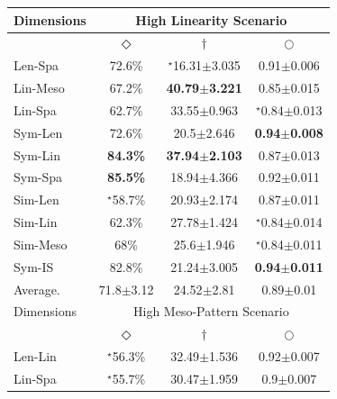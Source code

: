 \begin{table}[t!]
{\begin{tabular}{|l|ccc|}
Dimensions & \multicolumn{3}{c|}{High Linearity Scenario}                                                  \\ \hline
           & \multicolumn{1}{c|}{$\Diamond$} & \multicolumn{1}{c|}{$\dagger$} & $\bigcirc$                 \\ \hline
Len-Spa    & 72.6\%                          & $^{\star}${16.31$\pm$3.035}    & 0.91$\pm$0.006             \\ \hline
Lin-Meso   & 67.2\%                          & \textbf{40.79$\pm$3.221}       & 0.85$\pm$0.015             \\ \hline
Lin-Spa    & 62.7\%                          & 33.55$\pm$0.963                & $^{\star}${0.84$\pm$0.013} \\ \hline
Sym-Len    & 72.6\%                          & 20.5$\pm$2.646                 & \textbf{0.94$\pm$0.008}    \\ \hline
Sym-Lin    & \textbf{84.3\%}                 & \textbf{37.94$\pm$2.103}       & 0.87$\pm$0.013             \\ \hline
Sym-Spa    & \textbf{85.5\%}                 & 18.94$\pm$4.366                & 0.92$\pm$0.011             \\ \hline
Sim-Len    & $^{\star}${58.7\%}              & 20.93$\pm$2.174                & 0.87$\pm$0.011             \\ \hline
Sim-Lin    & 62.3\%                          & 27.78$\pm$1.424                & $^{\star}${0.84$\pm$0.014} \\ \hline
Sim-Meso   & 68\%                            & 25.6$\pm$1.946                 & $^{\star}${0.84$\pm$0.011} \\ \hline
Sym-IS     & 82.8\%                          & 21.24$\pm$3.005                & \textbf{0.94$\pm$0.011}    \\ \hline
Average.   & 71.8$\pm$3.12                   & 24.52$\pm$2.81                 & 0.89$\pm$0.01              \\ \hline \hline
Dimensions & \multicolumn{3}{c|}{High Meso-Pattern Scenario}                                               \\ \hline
           & \multicolumn{1}{c|}{$\Diamond$} & \multicolumn{1}{c|}{$\dagger$} & $\bigcirc$                 \\ \hline
Len-Lin    & $^{\star}${56.3\%}              & 32.49$\pm$1.536                & 0.92$\pm$0.007             \\ \hline
Lin-Spa    & $^{\star}${55.7\%}              & 30.47$\pm$1.959                & 0.9$\pm$0.007              \\ \hline

\end{tabular}}
\end{table}
